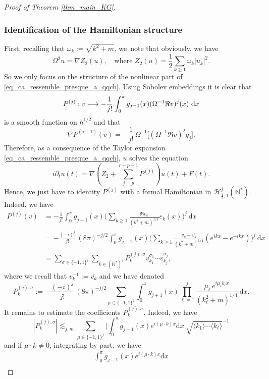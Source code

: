 \documentclass[11pt]{article}
\newcommand\mto{\mathchoice{\longmapsto}{\mapsto}{\mapsto}{\mapsto}}
\theoremstyle{definition}
\begin{document}
\begin{proof}[Proof of Theorem \ref{thm_main_KG}]
\subsubsection*{Identification of the Hamiltonian structure}
First, recalling that $\omega_k:= \sqrt{k^2+m}$, we~note that obviously, we have
\[
\Omega^2 u = \nabla Z_2(u), \quad \text{where } Z_2(u) = \frac12 \sum_{k\geq 1} \omega_k |u_k|^2.
\]
So we only focus on the structure of the nonlinear part of \eqref{eq_ca_ressemble_presque_a_qqch}. Using Sobolev embed\-dings it is clear that
\[
P^{(j)}: v\mto - \frac1{j !}\int_0^\pi g_{j-1}(x) (\Omega^{-1} \Re v)^j(x) \ \mathrm{d}x
\]
is a smooth function on $h^{1/2}$ and that
\[
\nabla P^{(j+1)}(v) = - \frac1{j !}\, \Omega^{-1}\bigl[(\Omega^{-1} \Re v)^j g_j\bigr].
\]
Therefore, as a consequence of the Taylor expansion \eqref{eq_ca_ressemble_presque_a_qqch}, $u$ solves the equation
\begin{equation}
\label{eq_ca_ressemble_a_ca}
i\partial_t u(t) = \nabla (Z_2 + \sum_{j=p}^{r+p-1} P^{(j)}) u(t) + F(t).
\end{equation}
Hence, we just have to identity $P^{(j)}$ with a formal Hamiltonian in $\mathscr{H}_{\frac12,1}^j(\mathbb{N}^*)$.
Indeed, we have
\begin{align*}
P^{(j)}(v) &= -\frac1{j !}\int_0^\pi g_{j-1}(x) \biggl(\sum_{k\geq 1} \frac{\Re v_k }{(k^2+m)^{1/4}} e_k(x) \biggr)^j \ \mathrm{d}x \\
&= -\frac{(-i)^j}{j !}\, (8\pi)^{-j/2} \int_0^\pi g_{j-1}(x) \biggl(\sum_{k\geq 1} \frac{v_k + \overline{v_k}}{(k^2+m)^{1/4}} (e^{ikx} - e^{-ikx})\biggr)^j \ \mathrm{d}x \\
&= \sum_{\sigma\in \{-1,1\}^j} \sum_{k\in (\mathbb{N}^*)^j} P^{(j),\sigma}_k v_{k_1}^{\sigma_1} \cdots v_{k_j}^{\sigma_j},
\end{align*}
where we recall that $v_k^{-1}:= \overline{v_k}$ and we have denoted
\[
P^{(j),\sigma}_k:= -\frac{(-i)^j}{j !}\, (8\pi)^{-j/2} \sum_{\mu \in \{-1,1\}^j} \int_0^\pi g_{j+1}(x) \prod_{\ell=1}^j \frac{\mu_{\ell}\, e^{i\mu_{\ell}k_{\ell}x}}{(k_\ell^2+m)^{1/4}} \ \mathrm{d}x.
\]
It remains to estimate the coefficients $P^{(j),\sigma}_k$. Indeed, we have
\[
|P^{(j),\sigma}_k| \lesssim_{j,m} \sum_{\mu \in \{-1,1\}^j} \biggl| \int_0^\pi g_{j-1}(x) e^{i(\mu \cdot k) x} \mathrm{d}x \biggr| \sqrt{ \langle k_1 \rangle \cdots \langle k_\ell \rangle }^{-1}
\]
and if $\mu \cdot k \neq 0$, integrating by part, we have
\begin{multline*}
\int_0^\pi g_{j-1}(x) e^{i(\mu \cdot k) x} \mathrm{d}x\\[-8pt]

\end{multline*}
\end{proof}
\end{document}
